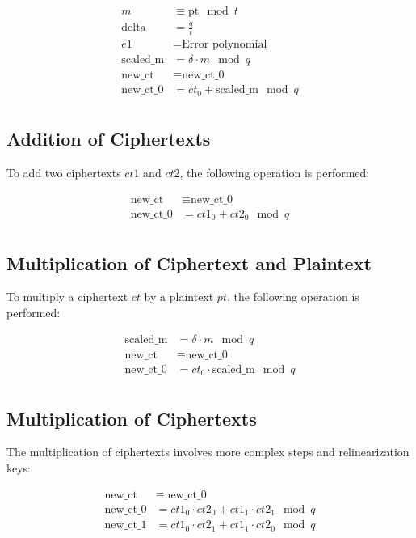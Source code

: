 \documentclass{article}
\begin{document}
\begin{align*}
    m &\equiv \text{pt} \mod t \\
    \text{delta} &= \frac{q}{t} \\
    e1 &= \text{Error polynomial} \\
    \text{scaled\_m} &= \delta \cdot m \mod q \\
    \text{new\_ct} &\equiv \text{new\_ct\_0} \\
    \text{new\_ct\_0} &= ct_0 + \text{scaled\_m} \mod q \\
\end{align*}

\subsection{Addition of Ciphertexts}

To add two ciphertexts $ct1$ and $ct2$, the following operation is performed:

\begin{align*}
    \text{new\_ct} &\equiv \text{new\_ct\_0} \\
    \text{new\_ct\_0} &= ct1_0 + ct2_0 \mod q \\
\end{align*}

\subsection{Multiplication of Ciphertext and Plaintext}

To multiply a ciphertext $ct$ by a plaintext $pt$, the following operation is performed:

\begin{align*}
    \text{scaled\_m} &= \delta \cdot m \mod q \\
    \text{new\_ct} &\equiv \text{new\_ct\_0} \\
    \text{new\_ct\_0} &= ct_0 \cdot \text{scaled\_m} \mod q \\
\end{align*}

\subsection{Multiplication of Ciphertexts}

The multiplication of ciphertexts involves more complex steps and relinearization keys:

\begin{align*}
    \text{new\_ct} &\equiv \text{new\_ct\_0} \\
    \text{new\_ct\_0} &= ct1_0 \cdot ct2_0 + ct1_1 \cdot ct2_1 \mod q \\
    \text{new\_ct\_1} &= ct1_0 \cdot ct2_1 + ct1_1 \cdot ct2_0 \mod q \\
\end{align*}
\end{document}
